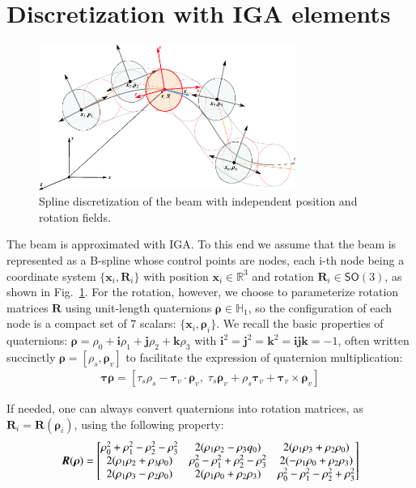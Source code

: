 \documentclass[review]{elsarticle}
\def\avect#1{{\boldsymbol{#1}}}
\def\amatr#1{{\boldsymbol{#1}}}
\begin{document}
\section{Discretization with IGA elements}


\begin{figure}[ht]
\centering
\includegraphics[width=0.75\textwidth]{beam_cosserat.pdf}
\caption{Spline discretization of the beam with independent position and rotation fields.}
\label{figdiscretize}
\end{figure}


The beam is approximated with IGA. 
To this end we assume that the beam is represented as a B-spline whose control points are nodes, each i-th node being a coordinate system $\{\avect{x}_i, \amatr{R}_i\}$ with position $\avect{x}_i \in \mathbb{R}^3$ and rotation $\amatr{R}_i \in \mathsf{SO}(3)$, as shown in Fig.~\ref{figdiscretize}.
For the rotation, however, we choose to parameterize rotation matrices $\amatr{R}$ using unit-length quaternions $\avect{\rho} \in \mathbb{H}_1$, so the configuration of each node is a compact set of 7 scalars: $\{\avect{x}_i, \avect{\rho}_i\}$.
We recall the basic properties of quaternions:
$\avect{\rho}=\rho_{0}+\avect{i}\rho_{1}+\avect{j}\rho_{2}+\avect{k}\rho_{3}$ with
$\avect{i}^2=\avect{j}^2=\avect{k}^2=\avect{i}\avect{j}\avect{k}=-1$, 
often written succinctly
$\avect{\rho}=[\rho_{s},\avect{\rho}_{v}]$ to facilitate the expression of quaternion multiplication:
\begin{align} 
\avect{\tau}\avect{\rho} = [ \tau_{s}\rho_{s} - \avect{\tau}_{v}\cdot\avect{\rho}_{v}, \;
\tau_{s}\avect{\rho}_{v} + \rho_{s}\avect{\tau}_{v} + \avect{\tau}_{v} \times \avect{\rho}_{v} ]
	\label{eq:quatproduct}
\end{align}

If needed, one can always convert quaternions into rotation matrices, as $\amatr{R}_i = \amatr{R}(\avect{\rho}_i)$, using the following property:
\begin{align}
\amatr{R}(\avect{\rho}) = \left[
	\begin{matrix}
	 \rho_0^2 + \rho_1^2 - \rho_2^2 - \rho_3^2  &  2(\rho_1 \rho_2 - \rho_3 q_0)   &  2(\rho_1 \rho_3 + \rho_2 \rho_0)  \cr
	 2(\rho_1 \rho_2 + \rho_3 \rho_0)  &  \rho_0^2 - \rho_1^2 + \rho_2^2 - \rho_3^2  &   2(-\rho_1 \rho_0 + \rho_2 \rho_3) \cr
   2(\rho_1 \rho_3 - \rho_2 \rho_0)  &  2(\rho_1 \rho_0 + \rho_2 \rho_3)  & \rho_0 ^2 -\rho_1^2 -\rho_2^2 + \rho_3^2   
	\end{matrix}
	\right]
	\label{eq:quatmatrix}
\end{align}
%
\end{document}
